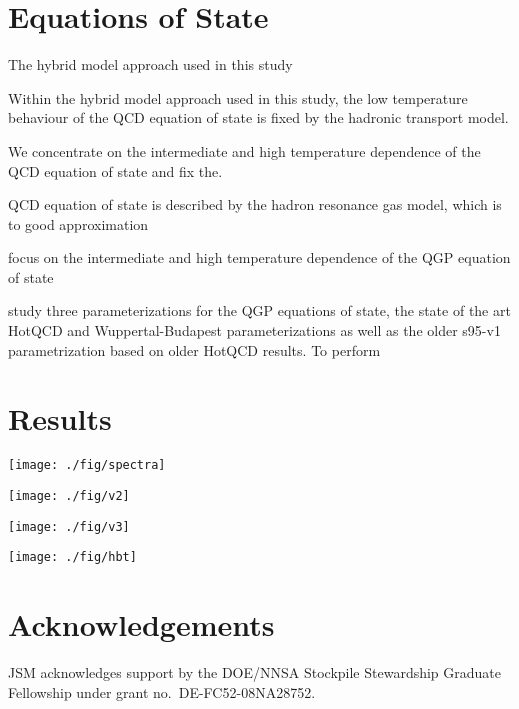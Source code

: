 \documentclass[aps,prc,reprint,amsmath,nofootinbib,superscriptaddress]{revtex4-1}
\begin{document}
\section{Equations of State}

The hybrid model approach used in this study 

Within the hybrid model approach used in this study, the low temperature behaviour of the QCD equation of state is fixed by the hadronic transport model.

We concentrate on the intermediate and high temperature dependence of the QCD equation of state and fix the.


QCD equation of state is described by the hadron 
resonance gas model, which is to good approximation



focus on the intermediate and high temperature dependence of the QGP equation of state


study three parameterizations for the QGP equations of state, the state of the art HotQCD and Wuppertal-Budapest parameterizations \cite{?} as well as the 
older s95-v1 parametrization based on older HotQCD results. To perform


\section{Results}

\begin{figure*}[t]
  \texttt{[image: ./fig/spectra]}
  \caption{
    \label{fig:spectra}
  }
\end{figure*}

\begin{figure*}[t]
  \texttt{[image: ./fig/v2]}
  \caption{
    \label{fig:spectra}
  }
\end{figure*}

\begin{figure*}[t]
  \texttt{[image: ./fig/v3]}
  \caption{
    \label{fig:spectra}
  }
\end{figure*}

\begin{figure*}[t]
  \texttt{[image: ./fig/hbt]}
  \caption{
    \label{fig:spectra}
  }
\end{figure*}


\section{Acknowledgements}

\medskip
JSM acknowledges support by the DOE/NNSA Stockpile Stewardship Graduate Fellowship under grant no.~DE-FC52-08NA28752.


\end{document}
